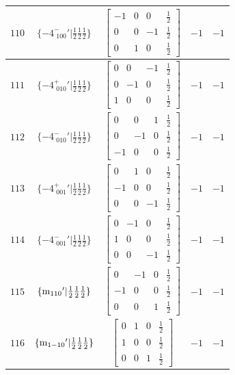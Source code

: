 \documentclass[fleqn,8pt]{jsarticle}
\begin{document}
\begin{longtable}{ccccc}
$ 110 $ & $ \{-4^{-}_{\,\,100}{}'|\frac{1}{2} \frac{1}{2} \frac{1}{2}\} $ & $ \begin{bmatrix} -1 & 0 & 0 & \frac{1}{2} \\ 0 & 0 & -1 & \frac{1}{2} \\ 0 & 1 & 0 & \frac{1}{2} \end{bmatrix} $ & $ -1 $ & $ -1 $ \\ \hline
$ 111 $ & $ \{-4^{+}_{\,\,010}{}'|\frac{1}{2} \frac{1}{2} \frac{1}{2}\} $ & $ \begin{bmatrix} 0 & 0 & -1 & \frac{1}{2} \\ 0 & -1 & 0 & \frac{1}{2} \\ 1 & 0 & 0 & \frac{1}{2} \end{bmatrix} $ & $ -1 $ & $ -1 $ \\ \hline
$ 112 $ & $ \{-4^{-}_{\,\,010}{}'|\frac{1}{2} \frac{1}{2} \frac{1}{2}\} $ & $ \begin{bmatrix} 0 & 0 & 1 & \frac{1}{2} \\ 0 & -1 & 0 & \frac{1}{2} \\ -1 & 0 & 0 & \frac{1}{2} \end{bmatrix} $ & $ -1 $ & $ -1 $ \\ \hline
$ 113 $ & $ \{-4^{+}_{\,\,001}{}'|\frac{1}{2} \frac{1}{2} \frac{1}{2}\} $ & $ \begin{bmatrix} 0 & 1 & 0 & \frac{1}{2} \\ -1 & 0 & 0 & \frac{1}{2} \\ 0 & 0 & -1 & \frac{1}{2} \end{bmatrix} $ & $ -1 $ & $ -1 $ \\ \hline
$ 114 $ & $ \{-4^{-}_{\,\,001}{}'|\frac{1}{2} \frac{1}{2} \frac{1}{2}\} $ & $ \begin{bmatrix} 0 & -1 & 0 & \frac{1}{2} \\ 1 & 0 & 0 & \frac{1}{2} \\ 0 & 0 & -1 & \frac{1}{2} \end{bmatrix} $ & $ -1 $ & $ -1 $ \\ \hline
$ 115 $ & $ \{{\rm m}_{110}{}'|\frac{1}{2} \frac{1}{2} \frac{1}{2}\} $ & $ \begin{bmatrix} 0 & -1 & 0 & \frac{1}{2} \\ -1 & 0 & 0 & \frac{1}{2} \\ 0 & 0 & 1 & \frac{1}{2} \end{bmatrix} $ & $ -1 $ & $ -1 $ \\ \hline
$ 116 $ & $ \{{\rm m}_{1-10}{}'|\frac{1}{2} \frac{1}{2} \frac{1}{2}\} $ & $ \begin{bmatrix} 0 & 1 & 0 & \frac{1}{2} \\ 1 & 0 & 0 & \frac{1}{2} \\ 0 & 0 & 1 & \frac{1}{2} \end{bmatrix} $ & $ -1 $ & $ -1 $ \\ \hline

\end{longtable}
\end{document}
